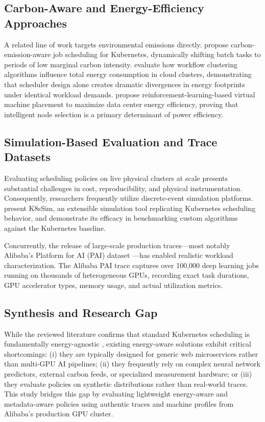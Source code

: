 \documentclass[a4paper,fleqn]{cas-dc}
\begin{document}
\subsection{Carbon-Aware and Energy-Efficiency Approaches}
A related line of work targets environmental emissions directly. \citet{piontek2023carbon} propose carbon-emission-aware job scheduling for Kubernetes, dynamically shifting batch tasks to periods of low marginal carbon intensity. \citet{saadi2023reducing} evaluate how workflow clustering algorithms influence total energy consumption in cloud clusters, demonstrating that scheduler design alone creates dramatic divergences in energy footprints under identical workload demands. \citet{amahrouch2025optimizing} propose reinforcement-learning-based virtual machine placement to maximize data center energy efficiency, proving that intelligent node selection is a primary determinant of power efficiency.

\subsection{Simulation-Based Evaluation and Trace Datasets}
Evaluating scheduling policies on live physical clusters at scale presents substantial challenges in cost, reproducibility, and physical instrumentation. Consequently, researchers frequently utilize discrete-event simulation platforms. \citet{wen2023k8ssim} present K8sSim, an extensible simulation tool replicating Kubernetes scheduling behavior, and demonstrate its efficacy in benchmarking custom algorithms against the Kubernetes baseline.

Concurrently, the release of large-scale production traces—most notably Alibaba's Platform for AI (PAI) dataset \citep{weng2022mlaas}—has enabled realistic workload characterization. The Alibaba PAI trace captures over 100,000 deep learning jobs running on thousands of heterogeneous GPUs, recording exact task durations, GPU accelerator types, memory usage, and actual utilization metrics.

\subsection{Synthesis and Research Gap}
While the reviewed literature confirms that standard Kubernetes scheduling is fundamentally energy-agnostic \citep{senjab2023survey,rejiba2022custom,carrion2022kubernetes,elkafhali2026survey}, existing energy-aware solutions exhibit critical shortcomings: (i) they are typically designed for generic web microservices rather than multi-GPU AI pipelines; (ii) they frequently rely on complex neural network predictors, external carbon feeds, or specialized measurement hardware; or (iii) they evaluate policies on synthetic distributions rather than real-world traces. This study bridges this gap by evaluating lightweight energy-aware and metadata-aware policies using authentic traces and machine profiles from Alibaba's production GPU cluster.
\end{document}

